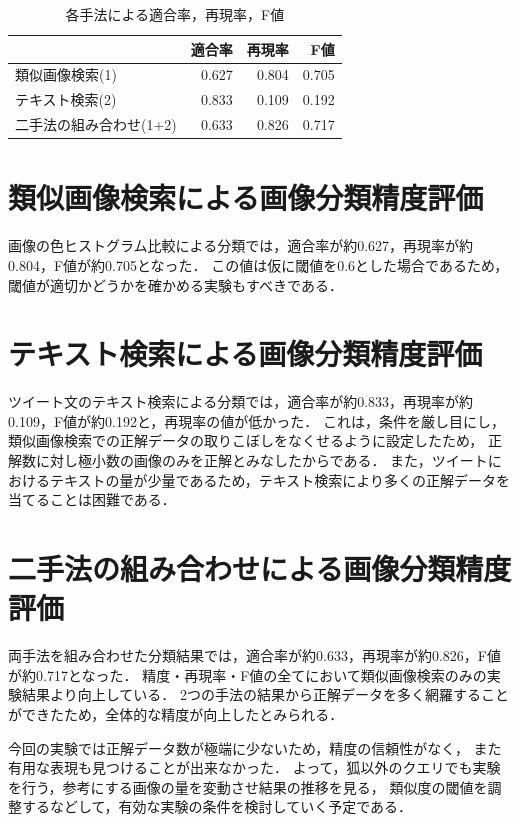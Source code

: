 \begin{table}[tb]
\begin{center}
\caption{各手法による適合率，再現率，F値}
\label{tab:result}
\begin{tabular}{|l|r|r|r|}\hline
& 適合率& 再現率& F値\\ \hline \hline
類似画像検索(1)& 0.627& 0.804& 0.705 \\ \hline
テキスト検索(2)& 0.833& 0.109& 0.192 \\ \hline
二手法の組み合わせ(1+2)& 0.633& 0.826& 0.717 \\ \hline
\end{tabular}
\end{center}
\end{table}

\section{類似画像検索による画像分類精度評価}
画像の色ヒストグラム比較による分類では，適合率が約0.627，再現率が約0.804，F値が約0.705となった．
この値は仮に閾値を0.6とした場合であるため，閾値が適切かどうかを確かめる実験もすべきである．

\section{テキスト検索による画像分類精度評価}
ツイート文のテキスト検索による分類では，適合率が約0.833，再現率が約0.109，F値が約0.192と，再現率の値が低かった．
これは，条件を厳し目にし，類似画像検索での正解データの取りこぼしをなくせるように設定したため，
正解数に対し極小数の画像のみを正解とみなしたからである．
また，ツイートにおけるテキストの量が少量であるため，テキスト検索により多くの正解データを当てることは困難である．

\section{二手法の組み合わせによる画像分類精度評価}
両手法を組み合わせた分類結果では，適合率が約0.633，再現率が約0.826，F値が約0.717となった．
精度・再現率・F値の全てにおいて類似画像検索のみの実験結果より向上している．
2つの手法の結果から正解データを多く網羅することができたため，全体的な精度が向上したとみられる．

今回の実験では正解データ数が極端に少ないため，精度の信頼性がなく，
また有用な表現も見つけることが出来なかった．
よって，狐以外のクエリでも実験を行う，参考にする画像の量を変動させ結果の推移を見る，
類似度の閾値を調整するなどして，有効な実験の条件を検討していく予定である．

